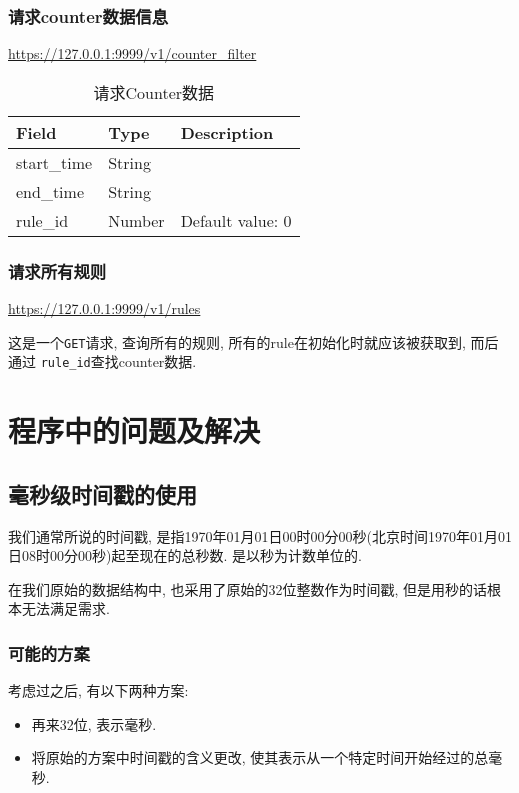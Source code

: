 \subsection{请求counter数据信息}

\url{https://127.0.0.1:9999/v1/counter_filter}

\begin{table}[]
    \centering
    \caption{请求Counter数据}
    \label{tbl:get_counter}
    \begin{tabular}{lll}
    Field       & Type   & Description      \\ \hline
    start\_time & String &                  \\
    end\_time   & String &                  \\
    rule\_id    & Number & Default value: 0 \\ \hline
    \end{tabular}
\end{table}

\subsection{请求所有规则}

\url{https://127.0.0.1:9999/v1/rules}

这是一个\texttt{GET}请求, 查询所有的规则, 所有的rule在初始化时就应该被获取到,
而后通过 \texttt{rule\_id}查找counter数据.


\chapter{程序中的问题及解决}\label{chap:程序中的问题及解决}

\section{毫秒级时间戳的使用}

我们通常所说的时间戳,
是指1970年01月01日00时00分00秒(北京时间1970年01月01日08时00分00秒)起至现在的总秒数.
是以秒为计数单位的.

在我们原始的数据结构中, 也采用了原始的32位整数作为时间戳,
但是用秒的话根本无法满足需求.

\subsection{可能的方案}

考虑过之后, 有以下两种方案:

\begin{itemize}
\item
  再来32位, 表示毫秒.
\item
  将原始的方案中时间戳的含义更改,
  使其表示从一个特定时间开始经过的总毫秒.
\end{itemize}

